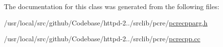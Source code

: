 The documentation for this class was generated from the following files\+:\begin{DoxyCompactItemize}
\item 
/usr/local/src/github/\+Codebase/httpd-\/2../srclib/pcre/\hyperlink{pcrecpparg_8h}{pcrecpparg.\+h}\item 
/usr/local/src/github/\+Codebase/httpd-\/2../srclib/pcre/\hyperlink{pcrecpp_8cc}{pcrecpp.\+cc}\end{DoxyCompactItemize}
